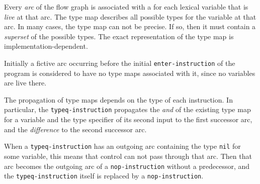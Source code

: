 Every \emph{arc} of the flow graph is associated with a  for each lexical variable that is \emph{live} at that arc.  The
type map describes all possible types for the variable at that arc.
In many cases, the type map can not be precise.  If so, then it must
contain a \emph{superset} of the possible types.  The exact
representation of the type map is implementation-dependent. 

Initially a fictive arc occurring before the initial
\texttt{enter-instruction} of the program is considered to have no
type maps associated with it, since no variables are live there.  

The propagation of type maps depends on the type of each instruction.
In particular, the \texttt{typeq-instruction} propagates the
\emph{and} of the existing type map for a variable and the type
specifier of its second input to the first successor arc, and the
\emph{difference} to the second successor arc.  

When a \texttt{typeq-instruction} has an outgoing arc containing the
type \texttt{nil} for some variable, this means that control can not
pass through that arc.  Then that arc becomes the outgoing arc of a
\texttt{nop-instruction} without a predecessor, and the
\texttt{typeq-instruction} itself is replaced by a
\texttt{nop-instruction}.%
